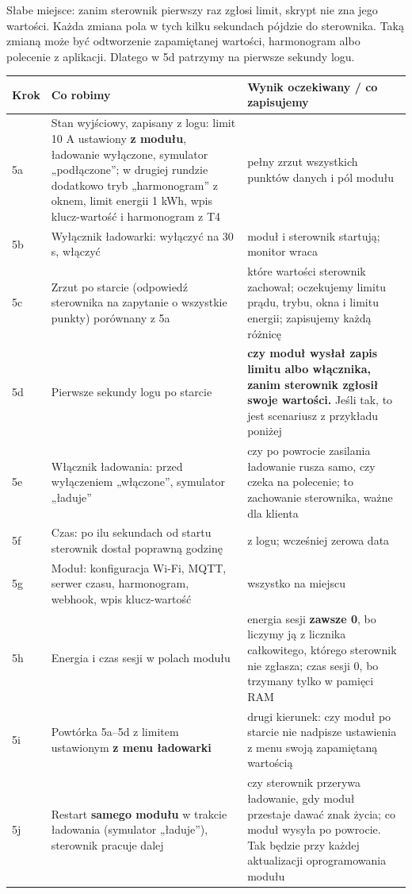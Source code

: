 \documentclass[11pt,a4paper]{article}
\begin{document}
Słabe miejsce: zanim sterownik pierwszy raz zgłosi limit, skrypt nie zna jego wartości. Każda zmiana pola w tych kilku sekundach pójdzie do sterownika. Taką zmianą może być odtworzenie zapamiętanej wartości, harmonogram albo polecenie z aplikacji. Dlatego w 5d patrzymy na pierwsze sekundy logu.


\begin{longtable}{>{\raggedright\arraybackslash}p{3.00cm}>{\raggedright\arraybackslash}p{6.14cm}>{\raggedright\arraybackslash}p{6.14cm}}
\toprule
\rowcolor{apteallight}\textbf{Krok} & \textbf{Co robimy} & \textbf{Wynik oczekiwany / co zapisujemy} \\
\midrule\endhead
\bottomrule\endfoot
5a & Stan wyjściowy, zapisany z logu: limit 10 A ustawiony \textbf{z modułu}, ładowanie wyłączone, symulator „podłączone”; w drugiej rundzie dodatkowo tryb „harmonogram” z oknem, limit energii 1 kWh, wpis klucz-wartość i harmonogram z T4 & pełny zrzut wszystkich punktów danych i pól modułu \\
5b & Wyłącznik ładowarki: wyłączyć na 30 s, włączyć & moduł i sterownik startują; monitor wraca \\
5c & Zrzut po starcie (odpowiedź sterownika na zapytanie o wszystkie punkty) porównany z 5a & które wartości sterownik zachował; oczekujemy limitu prądu, trybu, okna i limitu energii; zapisujemy każdą różnicę \\
5d & Pierwsze sekundy logu po starcie & \textbf{czy moduł wysłał zapis limitu albo włącznika, zanim sterownik zgłosił swoje wartości.} Jeśli tak, to jest scenariusz z przykładu poniżej \\
5e & Włącznik ładowania: przed wyłączeniem „włączone”, symulator „ładuje” & czy po powrocie zasilania ładowanie rusza samo, czy czeka na polecenie; to zachowanie sterownika, ważne dla klienta \\
5f & Czas: po ilu sekundach od startu sterownik dostał poprawną godzinę & z logu; wcześniej zerowa data \\
5g & Moduł: konfiguracja Wi-Fi, MQTT, serwer czasu, harmonogram, webhook, wpis klucz-wartość & wszystko na miejscu \\
5h & Energia i czas sesji w polach modułu & energia sesji \textbf{zawsze 0}, bo liczymy ją z licznika całkowitego, którego sterownik nie zgłasza; czas sesji 0, bo trzymany tylko w pamięci RAM \\
5i & Powtórka 5a–5d z limitem ustawionym \textbf{z menu ładowarki} & drugi kierunek: czy moduł po starcie nie nadpisze ustawienia z menu swoją zapamiętaną wartością \\
5j & Restart \textbf{samego modułu} w trakcie ładowania (symulator „ładuje”), sterownik pracuje dalej & czy sterownik przerywa ładowanie, gdy moduł przestaje dawać znak życia; co moduł wysyła po powrocie. Tak będzie przy każdej aktualizacji oprogramowania modułu \\
\end{longtable}
\end{document}
